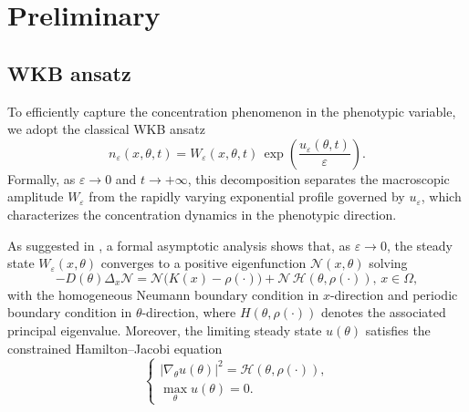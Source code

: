 \documentclass[11pt, dina4, amsfont12]{article}
\begin{document}





\section{Preliminary}


\subsection{WKB ansatz}
To efficiently capture the concentration phenomenon in the phenotypic variable, we adopt the classical WKB ansatz
\begin{equation}\label{eq:WKB}
   n_\varepsilon(x,\theta,t)
   = W_\varepsilon(x,\theta,t)\,
   \exp\!\left(\frac{u_\varepsilon(\theta,t)}{\varepsilon}\right).
\end{equation}
Formally, as $\varepsilon \to 0$ and $t \to +\infty$, this decomposition separates the macroscopic amplitude $W_\varepsilon$ from the rapidly varying exponential profile governed by $u_\varepsilon$, which characterizes the concentration dynamics in the phenotypic direction.

As suggested in \cite{XXX}, a formal asymptotic analysis shows that, as $\varepsilon \to 0$, 
the steady state $W_\varepsilon(x,\theta)$ converges to a positive eigenfunction 
$\mathcal{N}(x,\theta)$ solving
\begin{equation}\label{eq:eigen_N}
    -D(\theta)\Delta_x \mathcal{N}
    = \mathcal{N}\bigl(K(x)-\rho(\cdot)\bigr)
    + \mathcal{N}\, \mathcal{H}(\theta,\rho(\cdot)), 
    \, x \in \Omega, 
\end{equation}
with the homogeneous Neumann boundary condition in $x$-direction and periodic boundary condition in $\theta$-direction, where $H(\theta,\rho(\cdot))$ denotes the associated principal eigenvalue.
Moreover, the limiting steady state $u(\theta)$ satisfies the constrained
Hamilton--Jacobi equation
\begin{equation}\label{eq:HJ_limit}
\begin{cases}
    |\nabla_\theta u(\theta)|^2 = \mathcal{H}(\theta,\rho(\cdot)), \\[1mm]
    \displaystyle \max_{\theta} u(\theta) = 0.
\end{cases}
\end{equation}
\end{document}
